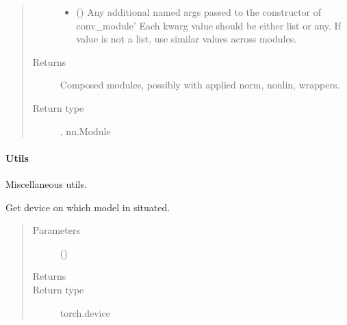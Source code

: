 \documentclass[letterpaper,10pt,english]{sphinxmanual}
\begin{document}
\begin{fulllineitems}
\begin{quote}
\begin{description}
\begin{itemize}
\item {} 
 () \textendash{} Any additional named args passed to the constructor of {\color{red}\bfseries{}\textasciigrave{}}conv\_module’
Each kwarg value should be either list or any. If value is not a list, use similar values across modules.

\end{itemize}

\item[{Returns}] \leavevmode
{} \textendash{} Composed modules, possibly with applied norm, nonlin, wrappers.

\item[{Return type}] \leavevmode
{}, nn.Module

\end{description}\end{quote}

\end{fulllineitems}



\paragraph{Utils}
\label{\detokenize{api/training:module-geology.metamodelling.utils}}\label{\detokenize{api/training:utils}}
Miscellaneous utils.

\begin{fulllineitems}
\label{\detokenize{api/training:geology.metamodelling.utils.get_model_device}}
Get device on which model in situated.
\begin{quote}\begin{description}
\item[{Parameters}] \leavevmode
{} () \textendash{} 

\item[{Returns}] \leavevmode
{}

\item[{Return type}] \leavevmode
torch.device

\end{description}\end{quote}

\end{fulllineitems}
\end{document}
